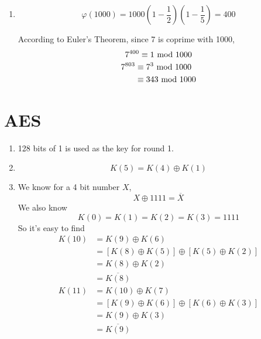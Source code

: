 \documentclass{article}
\renewcommand{\mod}{{\rm\ mod\ }}
\begin{document}
\begin{enumerate}
\item
$$\varphi(1000)=1000\left(1-\frac{1}{2}\right)\left(1-\frac{1}{5}\right)=400$$

According to Euler's Theorem, since 7 is coprime with 1000, $$7^{400}\equiv1\mod1000$$
\begin{align*}
7^{803}&\equiv7^3\mod1000\\
&\equiv343\mod1000
\end{align*}
\end{enumerate}

\section{AES}
\begin{enumerate}
\item
128 bits of 1 is used as the key for round 1.
\item
$$K(5)=K(4)\oplus K(1)$$
\item
We know for a 4 bit number $X$, $$X\oplus 1111=\overline{X}$$
We also know $$K(0)=K(1)=K(2)=K(3)=1111$$
So it's easy to find
\begin{align*}
K(10)&=K(9)\oplus K(6)\\
&=[K(8)\oplus K(5)]\oplus[K(5)\oplus K(2)]\\
&=K(8)\oplus K(2)\\
&=\overline{K(8)}\\
K(11)&=K(10)\oplus K(7)\\
&=[K(9)\oplus K(6)]\oplus[K(6)\oplus K(3)]\\
&=K(9)\oplus K(3)\\
&=\overline{K(9)}
\end{align*}
\end{enumerate}
\end{document}
